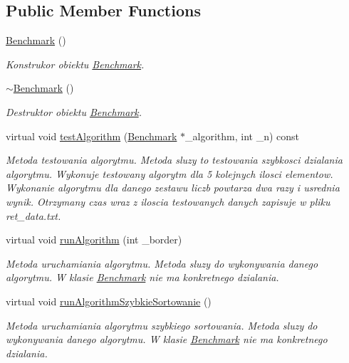 \subsection*{Public Member Functions}
\begin{DoxyCompactItemize}
\item 
\hyperlink{class_benchmark_acfca497989836a688d44477802e822d8}{Benchmark} ()
\begin{DoxyCompactList}\small\item\em Konstrukor obiektu \hyperlink{class_benchmark}{Benchmark}. \end{DoxyCompactList}\item 
\hyperlink{class_benchmark_a20476e07f09e2b20ed3e9a7f13a570e6}{$\sim$\+Benchmark} ()
\begin{DoxyCompactList}\small\item\em Destruktor obiektu \hyperlink{class_benchmark}{Benchmark}. \end{DoxyCompactList}\item 
virtual void \hyperlink{class_benchmark_a900bc0d26c2ed6aa45afe4d5b295ccd1}{test\+Algorithm} (\hyperlink{class_benchmark}{Benchmark} $\ast$\+\_\+algorithm, int \+\_\+n) const 
\begin{DoxyCompactList}\small\item\em Metoda testowania algorytmu. Metoda sluzy to testowania szybkosci dzialania algorytmu. Wykonuje testowany algorytm dla 5 kolejnych ilosci elementow. Wykonanie algorytmu dla danego zestawu liczb powtarza dwa razy i usrednia wynik. Otrzymany czas wraz z iloscia testowanych danych zapisuje w pliku ret\+\_\+data.\+txt. \end{DoxyCompactList}\item 
virtual void \hyperlink{class_benchmark_a6363894c058e8bfe146de09d7126b29c}{run\+Algorithm} (int \+\_\+border)
\begin{DoxyCompactList}\small\item\em Metoda uruchamiania algorytmu. Metoda sluzy do wykonywania danego algorytmu. W klasie \hyperlink{class_benchmark}{Benchmark} nie ma konkretnego dzialania. \end{DoxyCompactList}\item 
virtual void \hyperlink{class_benchmark_a05a8e8b9b80949f51c2ccc47e08dedbb}{run\+Algorithm\+Szybkie\+Sortowanie} ()
\begin{DoxyCompactList}\small\item\em Metoda uruchamiania algorytmu szybkiego sortowania. Metoda sluzy do wykonywania danego algorytmu. W klasie \hyperlink{class_benchmark}{Benchmark} nie ma konkretnego dzialania. \end{DoxyCompactList}\end{DoxyCompactItemize}
